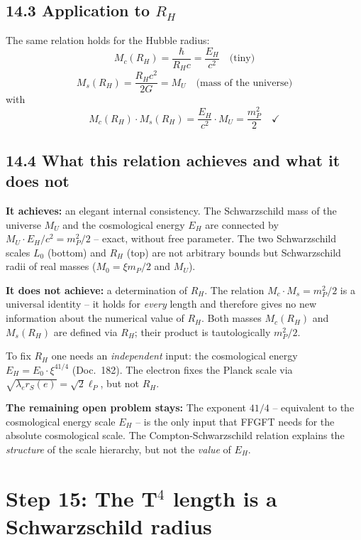 \subsection*{14.3 Application to $R_H$}

The same relation holds for the Hubble radius:
\[
  M_c(R_H) = \frac{\hbar}{R_H c} = \frac{E_H}{c^2}
  \quad\text{(tiny)}
\]
\[
  M_s(R_H) = \frac{R_H c^2}{2G} = M_U
  \quad\text{(mass of the universe)}
\]
with
\[
  M_c(R_H)\cdot M_s(R_H) = \frac{E_H}{c^2}\cdot M_U
  = \frac{m_P^2}{2}
  \quad\checkmark
\]

\subsection*{14.4 What this relation achieves and what it does not}

\textbf{It achieves:} an elegant internal consistency.
The Schwarzschild mass of the universe $M_U$ and the
cosmological energy $E_H$ are connected by $M_U \cdot E_H/c^2 = m_P^2/2$
-- exact, without free parameter. The two Schwarzschild scales
$L_0$ (bottom) and $R_H$ (top) are not arbitrary bounds
but Schwarzschild radii of real masses ($M_0 = \xi m_P/2$ and $M_U$).

\textbf{It does not achieve:} a determination of $R_H$.
The relation $M_c \cdot M_s = m_P^2/2$ is a universal identity --
it holds for \emph{every} length and therefore gives no new information
about the numerical value of $R_H$. Both masses $M_c(R_H)$ and $M_s(R_H)$
are defined via $R_H$; their product is tautologically $m_P^2/2$.

To fix $R_H$ one needs an \emph{independent} input:
the cosmological energy $E_H = E_0\cdot\xi^{41/4}$ (Doc.~182).
The electron fixes the Planck scale via
$\sqrt{\lambda_e r_S(e)} = \sqrt{2}\ell_P$, but not $R_H$.

\textbf{The remaining open problem stays:}
The exponent $41/4$ -- equivalent to the cosmological energy scale $E_H$ --
is the only input that FFGFT needs for the absolute cosmological scale.
The Compton-Schwarzschild relation explains the \emph{structure}
of the scale hierarchy, but not the \emph{value} of $E_H$.

\section{Step 15: The T$^4$ length is a Schwarzschild radius}

